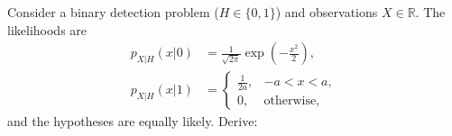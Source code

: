 
\question


Consider a binary detection problem ($H \in \{0,1\}$) and observations $X \in \mathbb{R}$. The likelihoods are
\begin{align*}
  p_{X|H}(x|0) &= \frac{1}{\sqrt{2 \pi}} \exp \left(- \frac{x^2}{2}\right), \\
  p_{X|H}(x|1) &= \begin{cases} \frac{1}{2 a}, & -a < x < a, \\ 0, & \text{otherwise}, \end{cases}
\end{align*}
and the hypotheses are equally likely. Derive:

